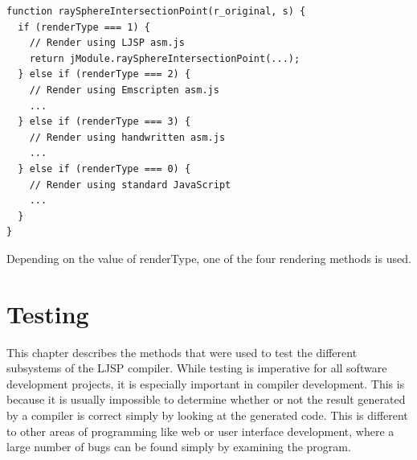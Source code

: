 \documentclass[11pt]{report}
\begin{document}
\begin{lstlisting}
function raySphereIntersectionPoint(r_original, s) {
  if (renderType === 1) {
    // Render using LJSP asm.js
    return jModule.raySphereIntersectionPoint(...);
  } else if (renderType === 2) {
    // Render using Emscripten asm.js
    ...
  } else if (renderType === 3) {
    // Render using handwritten asm.js
    ...
  } else if (renderType === 0) {
    // Render using standard JavaScript
    ...
  }
}
\end{lstlisting}

Depending on the value of renderType, one of the four rendering methods is used.









\chapter{Testing}
This chapter describes the methods that were used to test the different subsystems of the LJSP compiler. While testing is imperative for all software development projects, it is especially important in compiler development. This is because it is usually impossible to determine whether or not the result generated by a compiler is correct simply by looking at the generated code. This is different to other areas of programming like web or user interface development, where a large number of bugs can be found simply by examining the program. 
\end{document}
